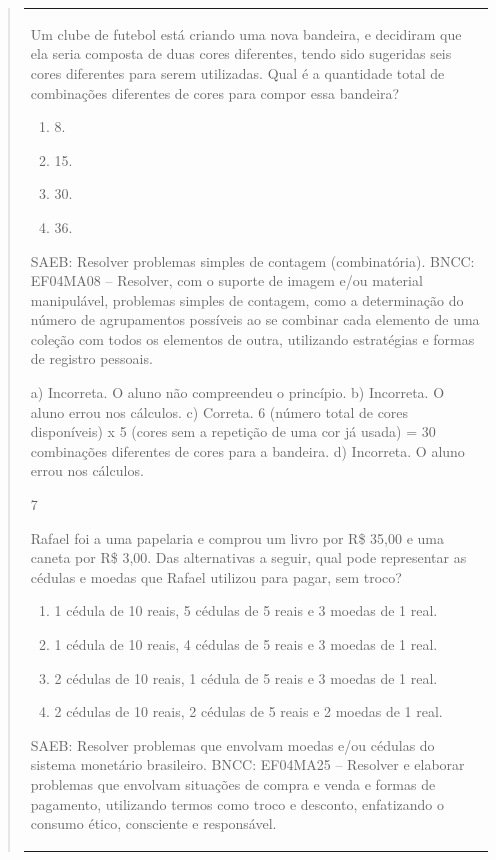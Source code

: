 \begin{mdframed}[linewidth=2pt,linecolor=salmao,roundcorner=2pt]
\begin{itemize}
{\begin{itemize}
\begin{escolha}
{\begin{quote}
{\begin{escolha}
{{{{{\begin{longtable}[]{@{}l@{}}
\begin{itemize}
{Um clube de futebol está criando uma nova bandeira, e decidiram que ela seria composta de duas cores diferentes, tendo sido sugeridas seis cores
diferentes para serem utilizadas. Qual é a quantidade total de combinações
diferentes de cores para compor essa bandeira?

\begin{enumerate}
\item
  8.
\item
  15.
\item
  30.
\item
  36.
\end{enumerate}

SAEB: Resolver problemas simples de contagem (combinatória).
BNCC: EF04MA08 -- Resolver, com o suporte de imagem e/ou material manipulável, problemas simples
de contagem, como a determinação do número de agrupamentos possíveis ao se combinar cada
elemento de uma coleção com todos os elementos de outra, utilizando estratégias e formas de
registro pessoais.

a) Incorreta. O aluno não compreendeu o princípio.
b) Incorreta. O aluno errou nos cálculos.
c) Correta. 6 (número total de cores disponíveis) x 5 (cores sem a repetição de uma cor já usada) = 30 combinações diferentes de cores para a bandeira.
d) Incorreta. O aluno errou nos cálculos.

\num{7}

Rafael foi a uma papelaria e comprou um livro por R\$ 35,00 e uma caneta
por R\$ 3,00. Das alternativas a seguir, qual pode representar as cédulas
e moedas que Rafael utilizou para pagar, sem troco?

\begin{enumerate}
\item
  1 cédula de 10 reais, 5 cédulas de 5 reais e 3 moedas de 1 real.
\item
  1 cédula de 10 reais, 4 cédulas de 5 reais e 3 moedas de 1 real.
\item
  2 cédulas de 10 reais, 1 cédula de 5 reais e 3 moedas de 1 real.
\item
  2 cédulas de 10 reais, 2 cédulas de 5 reais e 2 moedas de 1 real.
\end{enumerate}

SAEB: Resolver problemas que envolvam moedas e/ou cédulas do
sistema monetário brasileiro.
BNCC: EF04MA25 -- Resolver e elaborar problemas que envolvam situações de compra e venda e formas
de pagamento, utilizando termos como troco e desconto, enfatizando o consumo ético, consciente e
responsável.

}
\end{itemize}
\end{longtable}}}}}}
\end{escolha}}
\end{quote}}
\end{escolha}
\end{itemize}}
\end{itemize}
\end{mdframed}
